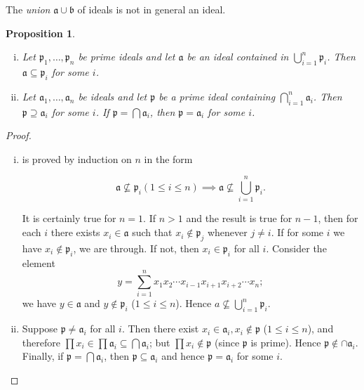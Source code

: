 \documentclass[class=book, crop=false]{standalone}
\newtheorem{proposition}[theorem]{Proposition}
\theoremstyle{definition}
\theoremstyle{remark}
\begin{document}
The \textit{union} $\mathfrak{a} \cup \mathfrak{b}$ of ideals is not in general
an ideal.
\begin{proposition}\label{prop:1.11}
  \begin{enumerate}[i)]
    \item Let $\mathfrak{p}_{1}, \ldots, \mathfrak{p}_{n}$ be prime ideals and
          let $\mathfrak{a}$ be an ideal contained in
          $\bigcup_{i=1}^{n} \mathfrak{p}_{i}$. Then
          $\mathfrak{a} \subseteq \mathfrak{p}_{i}$ for some $i$.
    \item Let $\mathfrak{a}_{1}, \ldots, \mathfrak{a}_{n}$ be ideals and let
          $\mathfrak{p}$ be a prime ideal containing
          $\bigcap_{i=1}^{n} \mathfrak{a}_{i}$. Then
          $\mathfrak{p} \supseteq \mathfrak{a}_{i}$ for some $i$. If
          $\mathfrak{p}=\bigcap \mathfrak{a}_{i}$, then
          $\mathfrak{p}=\mathfrak{a}_{i}$ for some $i$.
  \end{enumerate}
\end{proposition}
\begin{proof}
  \begin{enumerate}[i)]
    \item is proved by induction on $n$ in the form

\[
          \mathfrak{a} \nsubseteq \mathfrak{p}_{i}(1 \le i \le n) \implies \mathfrak{a} \nsubseteq \bigcup_{i=1}^{n} \mathfrak{p}_{i} .
          \]

          It is certainly true for $n=1$. If $n>1$ and the result is true for
          $n-1$, then for each $i$ there exists $x_{i} \in \mathfrak{a}$ such
          that $x_{i} \notin \mathfrak{p}_{j}$ whenever $j \neq i$. If for some
          $i$ we have $x_{i} \notin \mathfrak{p}_{i}$, we are through. If not,
          then $x_{i} \in \mathfrak{p}_{i}$ for all $i$. Consider the element
          \[
          y=\sum_{i=1}^{n} x_{1} x_{2} \cdots x_{i-1} x_{i+1} x_{i+2} \cdots x_{n};
          \]
          we have $y \in \mathfrak{a}$ and $y \notin \mathfrak{p}_{i}$
          ($1 \leq i \leq n$). Hence
          $a \nsubseteq \bigcup_{i=1}^{n} \mathfrak{p}_{i}$.
    \item Suppose $\mathfrak{p} \neq \mathfrak{a}_{i}$ for all $i$. Then there
          exist $x_{i} \in \mathfrak{a}_{i}, x_{i} \notin \mathfrak{p}$
          ($1 \leq i \leq n$), and therefore
          $\prod x_{i} \in \prod \mathfrak{a}_{i} \subseteq \bigcap \mathfrak{a}_{i}$;
          but $\prod x_{i} \notin \mathfrak{p}$ (since $\mathfrak{p}$ is prime).
          Hence $\mathfrak{p} \notin \cap \mathfrak{a}_{i}$. Finally, if
          $\mathfrak{p}=\bigcap \mathfrak{a}_{i}$, then
          $\mathfrak{p} \subseteq \mathfrak{a}_{i}$ and hence
          $\mathfrak{p}=\mathfrak{a}_{i}$ for some $i$.
  \end{enumerate}
\end{proof}
\end{document}

